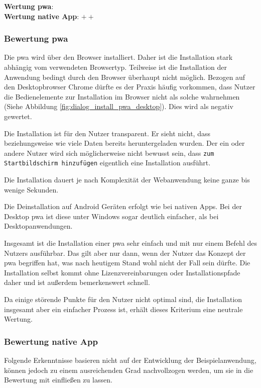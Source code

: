 \textbf{Wertung \ac{pwa}}: \Circle \\
\textbf{Wertung native App}: $++$ \\

\subsubsection{Bewertung \ac{pwa}}
Die \ac{pwa} wird über den Browser installiert. Daher ist die Installation stark abhängig vom verwendeten Browsertyp. Teilweise ist die Installation der Anwendung bedingt durch den Browser überhaupt nicht möglich. Bezogen auf den Desktopbrowser Chrome dürfte es der Praxis häufig vorkommen, dass Nutzer die Bedienelemente zur Installation im Browser nicht als solche wahrnehmen (Siehe Abbildung \ref{fig:dialog_install_pwa_desktop}). Dies wird als negativ gewertet.

Die Installation ist für den Nutzer transparent. Er sieht nicht, dass beziehungsweise wie viele Daten bereits heruntergeladen wurden. Der ein oder andere Nutzer wird sich möglicherweise nicht bewusst sein, dass \texttt{zum Startbildschirm hinzufügen} eigentlich eine Installation ausführt.

Die Installation dauert je nach Komplexität der Webanwendung keine ganze bis wenige Sekunden.

Die Deinstallation auf Android Geräten erfolgt wie bei nativen Apps. Bei der Desktop \ac{pwa} ist diese unter Windows sogar deutlich einfacher, als bei Desktopanwendungen.

Insgesamt ist die Installation einer \ac{pwa} sehr einfach und mit nur einem Befehl des Nutzers ausführbar. Das gilt aber nur dann, wenn der Nutzer das Konzept der \ac{pwa} begriffen hat, was nach heutigem Stand wohl nicht der Fall sein dürfte. Die Installation selbst kommt ohne Lizenzvereinbarungen oder Installationspfade daher und ist außerdem bemerkenswert schnell.

Da einige störende Punkte für den Nutzer nicht optimal sind, die Installation insgesamt aber ein einfacher Prozess ist, erhält dieses Kriterium eine neutrale Wertung.


\subsubsection{Bewertung native App}
Folgende Erkenntnisse basieren nicht auf der Entwicklung der Beispielanwendung, können jedoch zu einem ausreichenden Grad nachvollzogen werden, um sie in die Bewertung mit einfließen zu lassen.

